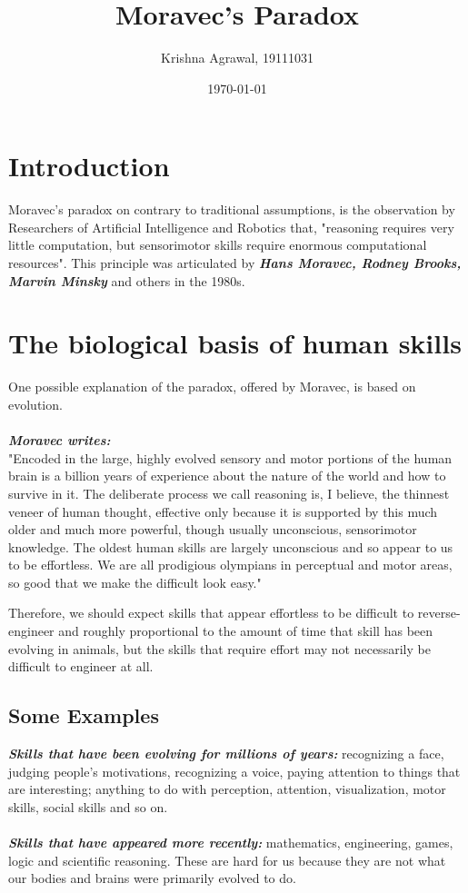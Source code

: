 \documentclass{article}
\title{Moravec's Paradox}
\author{Krishna Agrawal, 19111031}
\date{\today}
\begin{document}
\maketitle

\section{Introduction}
Moravec's paradox on contrary to traditional assumptions, is the observation by Researchers of Artificial Intelligence and Robotics that, "reasoning requires very little computation, but sensorimotor skills require enormous computational resources". This  principle was articulated by \textbf{\textit{Hans Moravec, Rodney Brooks, Marvin Minsky}} and others in the 1980s.  

\section{The biological basis of human skills}
One possible explanation of the paradox, offered by Moravec, is based on evolution.\\\\
\textbf{\textit{Moravec writes:}}\\
"Encoded in the large, highly evolved sensory and motor portions of the human brain is a billion years of experience about the nature of the world and how to survive in it. The deliberate process we call reasoning is, I believe, the thinnest veneer of human thought, effective only because it is supported by this much older and much more powerful, though usually unconscious, sensorimotor knowledge. The oldest human skills are largely unconscious and so appear to us to be effortless. We are all prodigious olympians in perceptual and motor areas, so good that we make the difficult look easy."

Therefore, we should expect skills that appear effortless to be difficult to reverse-engineer and roughly proportional to the amount of time that skill has been evolving in animals, but the skills that require effort may not necessarily be difficult to engineer at all.

\subsection*{Some Examples}

\textbf{\textit{Skills that have been evolving for millions of years:}} recognizing a face, judging people's motivations, recognizing a voice, paying attention to things that are interesting; anything to do with perception, attention, visualization, motor skills, social skills and so on.\\\\
\textbf{\textit{Skills that have appeared more recently:}} mathematics, engineering, games, logic and scientific reasoning. These are hard for us because they are not what our bodies and brains were primarily evolved to do. 
\end{document}

